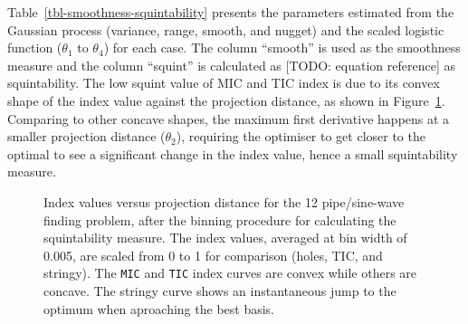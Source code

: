 \documentclass[
  number,
  preprint,
  3p]{elsarticle}
\begin{document}
Table~\ref{tbl-smoothness-squintability} presents the parameters
estimated from the Gaussian process (variance, range, smooth, and
nugget) and the scaled logistic function (\(\theta_1\) to \(\theta_4\))
for each case. The column ``smooth'' is used as the smoothness measure
and the column ``squint'' is calculated as {[}TODO: equation
reference{]} as squintability. The low squint value of MIC and TIC index
is due to its convex shape of the index value against the projection
distance, as shown in Figure~\ref{fig-idx-proj-dist}. Comparing to other
concave shapes, the maximum first derivative happens at a smaller
projection distance (\(\theta_2\)), requiring the optimiser to get
closer to the optimal to see a significant change in the index value,
hence a small squintability measure.

\begin{figure}


\caption{\label{fig-idx-proj-dist}Index values versus projection
distance for the 12 pipe/sine-wave finding problem, after the binning
procedure for calculating the squintability measure. The index values,
averaged at bin width of 0.005, are scaled from 0 to 1 for comparison
(holes, TIC, and stringy). The \texttt{MIC} and \texttt{TIC} index
curves are convex while others are concave. The stringy curve shows an
instantaneous jump to the optimum when aproaching the best basis.}

\end{figure}%
\end{document}
